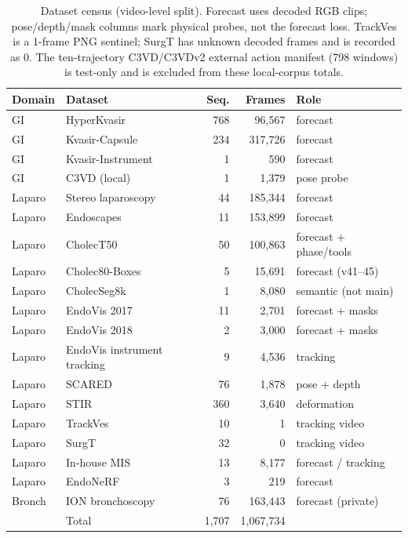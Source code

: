 \documentclass[preprint,12pt]{elsarticle}
\begin{document}
\begin{table}[t]
\centering
\caption{Dataset census (video-level split).
Forecast uses decoded RGB clips; pose/depth/mask columns mark physical probes,
not the forecast loss. TrackVes is a 1-frame PNG sentinel; SurgT has unknown
decoded frames and is recorded as 0. The ten-trajectory C3VD/C3VDv2 external
action manifest (798 windows) is test-only and is excluded from these
local-corpus totals.}
\label{tab:census}
\footnotesize
\setlength{\tabcolsep}{3.5pt}
\begin{tabular}{llrrl}
\toprule
Domain & Dataset & Seq. & Frames & Role \\
\midrule
GI & HyperKvasir~\cite{borgli2020hyperkvasir} & 768 & 96{,}567 & forecast \\
GI & Kvasir-Capsule~\cite{kvasircapsule} & 234 & 317{,}726 & forecast \\
GI & Kvasir-Instrument & 1 & 590 & forecast \\
GI & C3VD (local)~\cite{bobrow2023c3vd} & 1 & 1{,}379 & pose probe \\
Laparo & Stereo laparoscopy & 44 & 185{,}344 & forecast \\
Laparo & Endoscapes~\cite{endoscapes} & 11 & 153{,}899 & forecast \\
Laparo & CholecT50~\cite{nwoye2022rendezvous} & 50 & 100{,}863 & forecast + phase/tools \\
Laparo & Cholec80-Boxes~\cite{twinanda2017endonet} & 5 & 15{,}691 & forecast (v41--45) \\
Laparo & CholecSeg8k~\cite{hong2020cholecseg8k} & 1 & 8{,}080 & semantic (not main) \\
Laparo & EndoVis 2017~\cite{endovis2017} & 11 & 2{,}701 & forecast + masks \\
Laparo & EndoVis 2018~\cite{endovis2017} & 2 & 3{,}000 & forecast + masks \\
Laparo & EndoVis instrument tracking & 9 & 4{,}536 & tracking \\
Laparo & SCARED~\cite{allan2021scared} & 76 & 1{,}878 & pose + depth \\
Laparo & STIR~\cite{stir2024} & 360 & 3{,}640 & deformation \\
Laparo & TrackVes & 10 & 1 & tracking video \\
Laparo & SurgT & 32 & 0 & tracking video \\
Laparo & In-house MIS & 13 & 8{,}177 & forecast / tracking \\
Laparo & EndoNeRF & 3 & 219 & forecast \\
Bronch & ION bronchoscopy & 76 & 163{,}443 & forecast (private) \\
\midrule
 & Total & 1{,}707 & 1{,}067{,}734 & \\
\bottomrule
\end{tabular}
\end{table}
\end{document}
